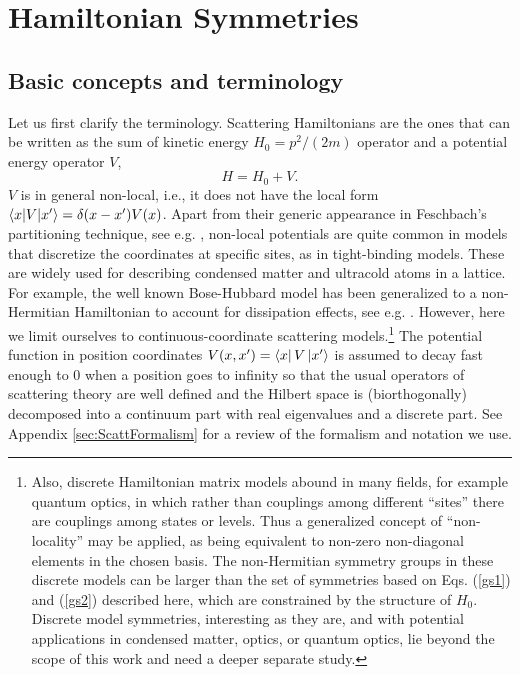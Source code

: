 \section{Hamiltonian Symmetries}
\label{sec:SymTheory}
%
\subsection{Basic concepts and terminology}
%
Let us first clarify the terminology. Scattering Hamiltonians are the ones that can be written as the sum of kinetic energy $H_0 = {p^2}/({2m})$ operator and a potential energy operator $V$,
%
\begin{equation}
    H = H_0 + V.
    \label{eq:ScatteringHamiltonian}
\end{equation}
%
$V$ is in general non-local, i.e., it does not have the local form $\langle x|V|x'\rangle=\delta(x-x')V(x)$.
Apart from their generic appearance in Feschbach's partitioning technique, see e.g. \cite{Ruschhaupt2004a},
non-local potentials   are quite common in models that discretize the coordinates at specific sites, as in tight-binding models.
These are widely used for describing condensed matter and ultracold atoms in a lattice. For example, the well known Bose-Hubbard model has been generalized to a non-Hermitian Hamiltonian to account for dissipation effects, see e.g. \cite{Hiller2006,Zhong2011}. However, here we limit ourselves to continuous-coordinate scattering models.\footnote{
Also, discrete Hamiltonian matrix models abound in many fields, for example quantum optics, in which rather than couplings
among different ``sites'' there are couplings among states or levels.
Thus a generalized concept of ``non-locality'' may be applied,
as being equivalent to non-zero non-diagonal elements in the chosen basis. The non-Hermitian symmetry groups in these discrete models
can be larger than the set of symmetries based on Eqs. (\ref{gs1}) and (\ref{gs2}) described here, which are constrained by the structure of $H_0$. Discrete model symmetries, interesting as they are, and
with potential applications in condensed matter, optics, or quantum optics,
lie beyond the scope of this work and need a deeper separate study.}
The potential function in position coordinates $V(x,x') = \bra{x}V\ket{x'}$ is assumed to decay fast enough to 0 when a position goes to infinity so that the usual operators of scattering theory are well defined and the Hilbert space is (biorthogonally) decomposed into a continuum
part with real eigenvalues and a discrete part. See Appendix \ref{sec:ScattFormalism} for a review of the formalism and notation we use.

